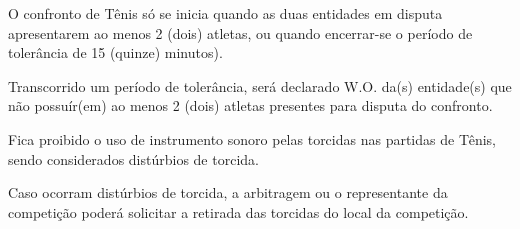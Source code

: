 \begin{article}
	O confronto de Tênis só se inicia quando as duas entidades em disputa apresentarem ao menos 2 (dois) atletas, ou quando encerrar-se o período de tolerância de 15 (quinze) minutos).

	\begin{xparagraph}
		Transcorrido um período de tolerância, será declarado W.O. da(s) entidade(s) que não possuír(em) ao menos 2 (dois) atletas presentes para disputa do confronto.
	\end{xparagraph}
\end{article}

\begin{article}
	Fica proibido o uso de instrumento sonoro pelas torcidas nas partidas de Tênis, sendo considerados distúrbios de torcida.

	\begin{xparagraph}
		Caso ocorram distúrbios de torcida, a arbitragem ou o representante da competição poderá solicitar a retirada das torcidas do local da competição.
	\end{xparagraph}
\end{article}
